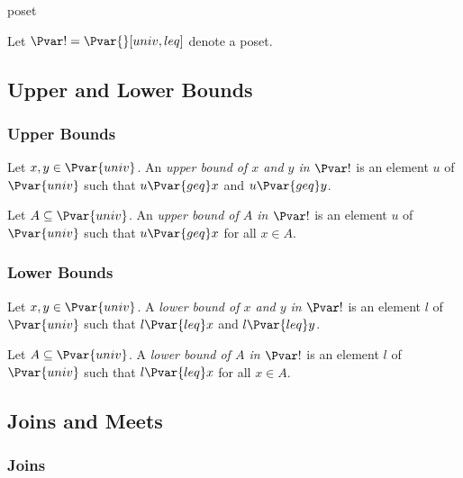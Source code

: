 \documentclass{stex}
\begin{document}
\begin{smodule}{poset}
\begin{forthel}
  Let $\Pvar!=\Pvar{}[univ,leq]$ denote a poset.
\end{forthel}

\subsection{Upper and Lower Bounds}

\subsubsection{Upper Bounds}

\begin{definition*}[forthel,id=UpperBoundOfPairDef,printid]
  Let $x, y \in \Pvar{univ}$.
  An \emph{upper bound of $x$ and $y$ in $\Pvar!$} is an element $u$ of $\Pvar{univ}$ such that $u {\Pvar{geq}} x$ and $u {\Pvar{geq}} y$.
\end{definition*}
    
\begin{definition*}[forthel,id=UpperBoundOfSetDef,printid]
  Let $A \subseteq \Pvar{univ}$.
  An \emph{upper bound of $A$ in $\Pvar!$} is an element $u$ of $\Pvar{univ}$ such that $u {\Pvar{geq}} x$ for all $x \in A$.
\end{definition*}

\subsubsection{Lower Bounds}
  
\begin{definition*}[forthel,id=LowerBoundOfPairDef,printid]
  Let $x, y \in \Pvar{univ}$.
  A \emph{lower bound of $x$ and $y$ in $\Pvar!$} is an element $l$ of $\Pvar{univ}$ such that $l {\Pvar{leq}} x$ and $l {\Pvar{leq}} y$.
\end{definition*}
    
\begin{definition*}[forthel,id=LowerBoundOfSetDef,printid]
  Let $A \subseteq \Pvar{univ}$.
  A \emph{lower bound of $A$ in $\Pvar!$} is an element $l$ of $\Pvar{univ}$ such that $l {\Pvar{leq}} x$ for all $x \in A$.
\end{definition*}

\subsection{Joins and Meets}

\subsubsection{Joins}


\end{smodule}
\end{document}
